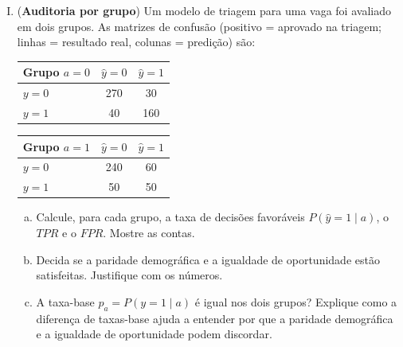 \documentclass{dlproblemset}
\begin{document}
\begin{enumerate}[I)]

    \item (\textbf{Auditoria por grupo}) Um modelo de triagem para uma vaga foi avaliado em dois grupos. As matrizes de confusão (positivo = aprovado na triagem; linhas = resultado real, colunas = predição) são:

    \begin{center}
    \begin{tabular}{lcc}
        \toprule
        \textbf{Grupo $a{=}0$} & \textbf{$\hat{y}{=}0$} & \textbf{$\hat{y}{=}1$} \\
        \midrule
        $y{=}0$ & 270 & 30 \\
        $y{=}1$ & 40  & 160 \\
        \bottomrule
    \end{tabular}
    \qquad
    \begin{tabular}{lcc}
        \toprule
        \textbf{Grupo $a{=}1$} & \textbf{$\hat{y}{=}0$} & \textbf{$\hat{y}{=}1$} \\
        \midrule
        $y{=}0$ & 240 & 60 \\
        $y{=}1$ & 50  & 50 \\
        \bottomrule
    \end{tabular}
    \end{center}

    \begin{enumerate}[(a)]
        \item Calcule, para cada grupo, a taxa de decisões favoráveis $P(\hat{y}{=}1 \mid a)$, o $TPR$ e o $FPR$. Mostre as contas.
        \item Decida se a paridade demográfica e a igualdade de oportunidade estão satisfeitas. Justifique com os números.
        \item A taxa-base $p_a = P(y{=}1 \mid a)$ é igual nos dois grupos? Explique como a diferença de taxas-base ajuda a entender por que a paridade demográfica e a igualdade de oportunidade podem discordar.
    \end{enumerate}


\end{enumerate}
\end{document}

